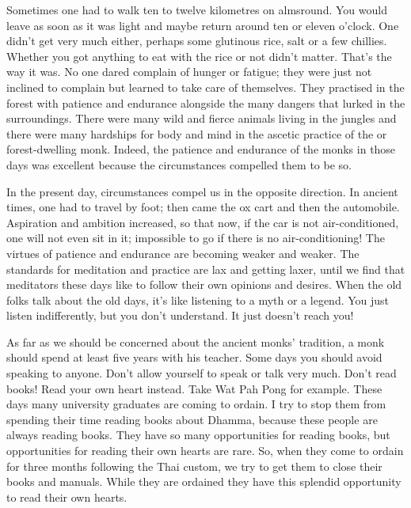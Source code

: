 Sometimes one had to walk ten to twelve kilometres on almsround. You would leave as soon as it was light and maybe return around ten or eleven o'clock. One didn't get very much either, perhaps some glutinous rice, salt or a few chillies. Whether you got anything to eat with the rice or not didn't matter. That's the way it was. No one dared complain of hunger or fatigue; they were just not inclined to complain but learned to take care of themselves. They practised in the forest with patience and endurance alongside the many dangers that lurked in the surroundings. There were many wild and fierce animals living in the jungles and there were many hardships for body and mind in the ascetic practice of the  or forest-dwelling monk. Indeed, the patience and endurance of the monks in those days was excellent because the circumstances compelled them to be so. 

In the present day, circumstances compel us in the opposite direction. In ancient times, one had to travel by foot; then came the ox cart and then the automobile. Aspiration and ambition increased, so that now, if the car is not air-conditioned, one will not even sit in it; impossible to go if there is no air-conditioning! The virtues of patience and endurance are becoming weaker and weaker. The standards for meditation and practice are lax and getting laxer, until we find that meditators these days like to follow their own opinions and desires. When the old folks talk about the old days, it's like listening to a myth or a legend. You just listen indifferently, but you don't understand. It just doesn't reach you! 

As far as we should be concerned about the ancient monks' tradition, a monk should spend at least five years with his teacher. Some days you should avoid speaking to anyone. Don't allow yourself to speak or talk very much. Don't read books! Read your own heart instead. Take Wat Pah Pong for example. These days many university graduates are coming to ordain. I try to stop them from spending their time reading books about Dhamma, because these people are always reading books. They have so many opportunities for reading books, but opportunities for reading their own hearts are rare. So, when they come to ordain for three months following the Thai custom, we try to get them to close their books and manuals. While they are ordained they have this splendid opportunity to read their own hearts. 

